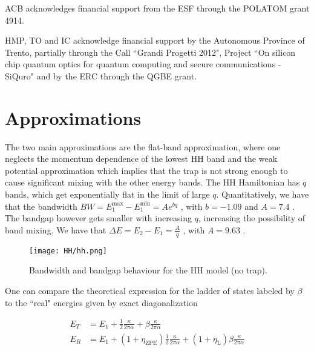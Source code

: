 \documentclass[twocolumn, 10pt, aps, superscriptaddress, floatfix, showpacs, prb, citeautoscript]{revtex4-1}
\begin{document}
\acknowledgments

ACB acknowledges financial support from the ESF through the POLATOM grant 4914.

HMP, TO and IC acknowledge financial support by the Autonomous Province of Trento, partially through the Call ``Grandi Progetti 2012", Project ``On silicon chip quantum optics for quantum computing and secure communications - SiQuro" and by the ERC through the QGBE grant.




\appendix

\section{Approximations}\label{app:approximations}
The two main approximations are the flat-band approximation, where one
neglects the momentum dependence of the lowest HH band and the weak
potential approximation which implies that the trap is not strong
enough to cause significant mixing with the other energy bands.  The
HH Hamiltonian has $q$ bands, which get exponentially flat in the
limit of large $q$. Quantitatively, we have that the bandwidth $BW =
E_1^{\text{max}} - E_1^{\text{min}} = A e^{b q}$ , with $b = -1.09$
and $A = 7.4$ . The bandgap however gets smaller with increasing $q$,
increasing the possibility of band mixing. We have that $\Delta E =
E_2 - E_1 = \frac{A}{q}$ , with $A=9.63$ .


\begin{figure}[htb]
  \centerline{\texttt{[image: HH/hh.png]}}
  \caption{Bandwidth and bandgap behaviour for the HH model (no trap).}
  \label{fig:energy_bands}
\end{figure}


One can compare the theoretical expression for the ladder of states labeled by $\beta$ 
to the ``real" energies given by exact diagonalization

\begin{subequations}
  \begin{align}
    E_T &= E_1 + \frac{1}{2}\frac{\kappa}{2\pi\alpha} + \beta \frac{\kappa}{2\pi\alpha}\\
    E_R &= E_1 +
          (1+\eta_{\text{ZPE}})\frac{1}{2}\frac{\kappa}{2\pi\alpha} +
          (1+\eta_{\text{L}})\beta \frac{\kappa}{2\pi\alpha}
  \end{align}   
\end{subequations}
  
\end{document}
